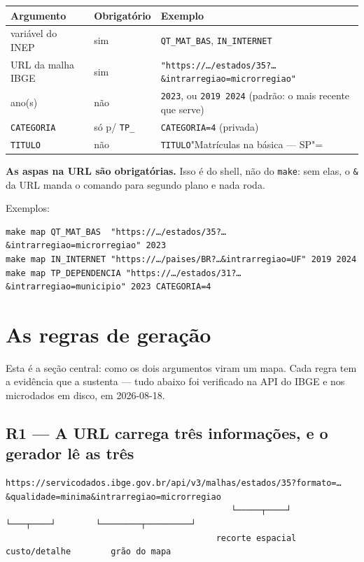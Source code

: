 \documentclass[11pt]{article}
\begin{document}
\begin{center}
\begin{tabular}{lll}
Argumento & Obrigatório & Exemplo\\
\hline
variável do INEP & sim & \texttt{QT\_MAT\_BAS}, \texttt{IN\_INTERNET}\\
URL da malha IBGE & sim & \texttt{"https://…/estados/35?…\&intrarregiao=microrregiao"}\\
ano(s) & não & \texttt{2023}, ou \texttt{2019 2024} (padrão: o mais recente que serve)\\
\texttt{CATEGORIA} & só p/ \texttt{TP\_} & \texttt{CATEGORIA=4} (privada)\\
\texttt{TITULO} & não & \texttt{TITULO}"Matrículas na básica — SP"=\\
\end{tabular}
\end{center}

\textbf{As aspas na URL são obrigatórias.} Isso é do shell, não do \texttt{make}: sem
elas, o \texttt{\&} da URL manda o comando para segundo plano e nada roda.

Exemplos:

\begin{verbatim}
make map QT_MAT_BAS  "https://…/estados/35?…&intrarregiao=microrregiao" 2023
make map IN_INTERNET "https://…/paises/BR?…&intrarregiao=UF" 2019 2024
make map TP_DEPENDENCIA "https://…/estados/31?…&intrarregiao=municipio" 2023 CATEGORIA=4
\end{verbatim}
\section{As regras de geração}
\label{sec:org95ec85a}

Esta é a seção central: como os dois argumentos viram um mapa. Cada regra
tem a evidência que a sustenta — tudo abaixo foi verificado na API do IBGE e
nos microdados em disco, em 2026-08-18.
\subsection{R1 — A URL carrega três informações, e o gerador lê as três}
\label{sec:orgf641db7}

\begin{verbatim}
https://servicodados.ibge.gov.br/api/v3/malhas/estados/35?formato=…&qualidade=minima&intrarregiao=microrregiao
                                             └─────┬────┘            └───┬────┘        └────────┬─────────┘
                                          recorte espacial         custo/detalhe        grão do mapa
\end{verbatim}
\end{document}
